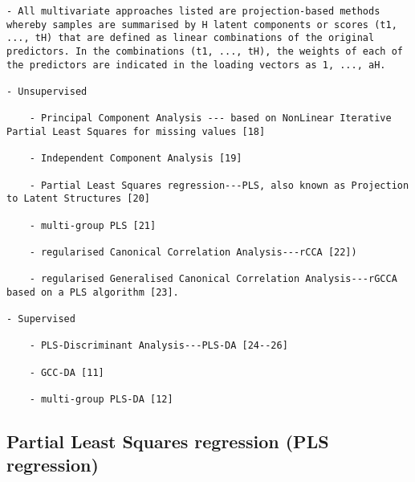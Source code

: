 \documentclass[
]{book}
\begin{document}
\begin{verbatim}
- All multivariate approaches listed are projection-based methods whereby samples are summarised by H latent components or scores (t1, ..., tH) that are defined as linear combinations of the original predictors. In the combinations (t1, ..., tH), the weights of each of the predictors are indicated in the loading vectors as 1, ..., aH.

- Unsupervised

    - Principal Component Analysis --- based on NonLinear Iterative Partial Least Squares for missing values [18]

    - Independent Component Analysis [19]

    - Partial Least Squares regression---PLS, also known as Projection to Latent Structures [20]

    - multi-group PLS [21]

    - regularised Canonical Correlation Analysis---rCCA [22])

    - regularised Generalised Canonical Correlation Analysis---rGCCA based on a PLS algorithm [23].

- Supervised

    - PLS-Discriminant Analysis---PLS-DA [24--26]

    - GCC-DA [11]

    - multi-group PLS-DA [12]
\end{verbatim}

\hypertarget{partial-least-squares-regression-pls-regression}{%
\subsection{Partial Least Squares regression (PLS regression)}\label{partial-least-squares-regression-pls-regression}}
\end{document}
